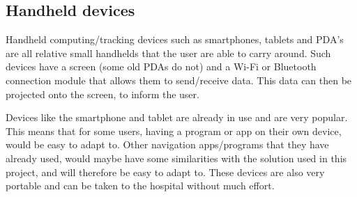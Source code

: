  	 
 	 

\subsection{Handheld devices} %
\label{sub:device}

 	 
Handheld computing/tracking devices such as smartphones, tablets and PDA's are all relative small handhelds that the user are able to carry around. Such devices have a screen (some old PDAs do not) and a Wi-Fi or Bluetooth connection module that allows them to send/receive data. This data can then be projected onto the screen, to inform the user.

Devices like the smartphone and tablet are already in use and are very popular. This means that for some users, having a program or app on their own device, would be easy to adapt to. Other navigation apps/programs that they have already used, would maybe have some similarities with the solution used in this project, and will therefore be easy to adapt to. These devices are also very portable and can be taken to the hospital without much effort.  

